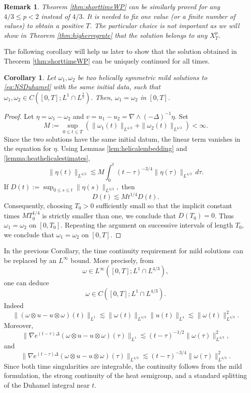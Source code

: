 \documentclass[11pt,a4paper]{article}
\newcommand{\w}{\omega}
\newtheorem{cor}[thm]{Corollary}
\newtheorem{rem}[thm]{Remark}
\begin{document}
\begin{rem}
Theorem \ref{thm:shorttimeWP} can be similarly proved for any $4/3\leq p<2$ instead of $4/3$. It is needed to fix one value (or a finite number of values) to obtain a positive $T$. The particular choice is not important as we will show in Theorem \ref{thm:higherregrate} that the solution belongs to any $X^p_T$.
\end{rem}
The following corollary will help us later to show that the solution obtained in Theorem \ref{thm:shorttimeWP} can be uniquely continued for all times.
\begin{cor}\label{cor:uniquenessNSLp}
Let $\w_1,\w_2$ be two helically symmetric mild solutions to \eqref{eq:NSDuhamel} with the same initial data, such that $\w_1,\w_2\in C([0,T];L^1\cap L^{\frac{4}{3}})$. Then, $\w_1=\w_2$ in $[0,T]$. 
\end{cor}
\begin{proof}
Let $\eta=\omega_1-\omega_2$ and
$v=u_1-u_2=\nabla\wedge(-\Delta)^{-1}\eta$. Set
$$
M:=\sup_{0\leq t\leq T}
\left(
\|\omega_1(t)\|_{L^{4/3}}
+\|\omega_2(t)\|_{L^{4/3}}
\right)<\infty.
$$
Since the two solutions have the same initial datum, the linear
term vanishes in the equation for $\eta$. Using Lemmas \ref{lem:helicalembedding} and \ref{lemma:heathelicalestimates},
$$
\|\eta(t)\|_{L^{4/3}}\lesssim
M\int_0^t(t-\tau)^{-3/4}\|\eta(\tau)\|_{L^{4/3}}\,d\tau.
$$
If $D(t):=\sup_{0\leq s\leq t}\|\eta(s)\|_{L^{4/3}},$
then
$$
D(t)\lesssim M t^{1/4}D(t).
$$
Consequently, choosing $T_0>0$ sufficiently small so that the
implicit constant times $M T_0^{1/4}$ is strictly smaller than
one, we conclude that $D(T_0)=0$. Thus
$\omega_1=\omega_2$ on $[0,T_0]$. Repeating the argument on successive
intervals of length $T_0$, we conclude that
$\omega_1=\omega_2$ on $[0,T]$.
\end{proof}

In the previous Corollary, the time continuity requirement for mild solutions can be replaced by an $L^\infty$ bound. More precisely, from
$$
\omega\in L^\infty([0,T];L^1\cap L^{4/3}),
$$
one can deduce
$$
\omega\in C([0,T];L^1\cap L^{4/3}).
$$
Indeed
$$
\|(\omega\otimes u-u\otimes\omega)(t)\|_{L^1}
 \lesssim \|\omega(t)\|_{L^{4/3}}\|u(t)\|_{L^4}
 \lesssim \|\omega(t)\|_{L^{4/3}}^2.
$$
Moreover,
$$
\|\nabla e^{(t-\tau)\Delta}(\omega\otimes u-u\otimes\omega)(\tau)\|_{L^1}
 \lesssim (t-\tau)^{-1/2}\|\omega(\tau)\|_{L^{4/3}}^2,
$$
and
$$
\|\nabla e^{(t-\tau)\Delta}(\omega\otimes u-u\otimes\omega)(\tau)\|_{L^{4/3}}
 \lesssim (t-\tau)^{-3/4}\|\omega(\tau)\|_{L^{4/3}}^2.
$$
Since both time singularities are integrable, the continuity follows
from the mild formulation, the strong continuity of the heat
semigroup, and a standard splitting of the Duhamel integral near
$t$.
\end{document}
